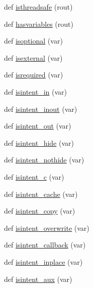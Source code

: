 \begin{DoxyCompactItemize}
\item 
def \hyperlink{namespacenumpy_1_1f2py_1_1auxfuncs_a7e5849cf4520114cc1488270d5b2fcfe}{isthreadsafe} (rout)
\item 
def \hyperlink{namespacenumpy_1_1f2py_1_1auxfuncs_a0e7678eaf6698fe18e0dadaeb4560460}{hasvariables} (rout)
\item 
def \hyperlink{namespacenumpy_1_1f2py_1_1auxfuncs_af2ba870991e6a36523f40733b8461b42}{isoptional} (var)
\item 
def \hyperlink{namespacenumpy_1_1f2py_1_1auxfuncs_a9712b9ff7805233672f47ae930270802}{isexternal} (var)
\item 
def \hyperlink{namespacenumpy_1_1f2py_1_1auxfuncs_a50c822ecf255569453f350a4ccc340f4}{isrequired} (var)
\item 
def \hyperlink{namespacenumpy_1_1f2py_1_1auxfuncs_a83e8249db7f4024f6359d57a71538e28}{isintent\+\_\+in} (var)
\item 
def \hyperlink{namespacenumpy_1_1f2py_1_1auxfuncs_a27daae5a089092459b4db15b4cd1ece5}{isintent\+\_\+inout} (var)
\item 
def \hyperlink{namespacenumpy_1_1f2py_1_1auxfuncs_ae40f8c19296b80583e05bced5dfff4ed}{isintent\+\_\+out} (var)
\item 
def \hyperlink{namespacenumpy_1_1f2py_1_1auxfuncs_af9b614f6025c64b7d9ed47b08b473974}{isintent\+\_\+hide} (var)
\item 
def \hyperlink{namespacenumpy_1_1f2py_1_1auxfuncs_a0070e4bee3d9702b16700d95d215f190}{isintent\+\_\+nothide} (var)
\item 
def \hyperlink{namespacenumpy_1_1f2py_1_1auxfuncs_ab44bbd36005b692af0b8e32a79df4b54}{isintent\+\_\+c} (var)
\item 
def \hyperlink{namespacenumpy_1_1f2py_1_1auxfuncs_afbcfd96918f6ce1f96565c112585960b}{isintent\+\_\+cache} (var)
\item 
def \hyperlink{namespacenumpy_1_1f2py_1_1auxfuncs_ab4e2da1496082c85875e5dfc80d843a9}{isintent\+\_\+copy} (var)
\item 
def \hyperlink{namespacenumpy_1_1f2py_1_1auxfuncs_a637796fa232e683b536ffed4d2f02fab}{isintent\+\_\+overwrite} (var)
\item 
def \hyperlink{namespacenumpy_1_1f2py_1_1auxfuncs_a0ffa68816b01138d2227857c623cfee6}{isintent\+\_\+callback} (var)
\item 
def \hyperlink{namespacenumpy_1_1f2py_1_1auxfuncs_a47663022fe4a66fa60cd708aed0d1162}{isintent\+\_\+inplace} (var)
\item 
def \hyperlink{namespacenumpy_1_1f2py_1_1auxfuncs_afb0bfbba8bd9e205120910ebd6b6331d}{isintent\+\_\+aux} (var)

\end{DoxyCompactItemize}
